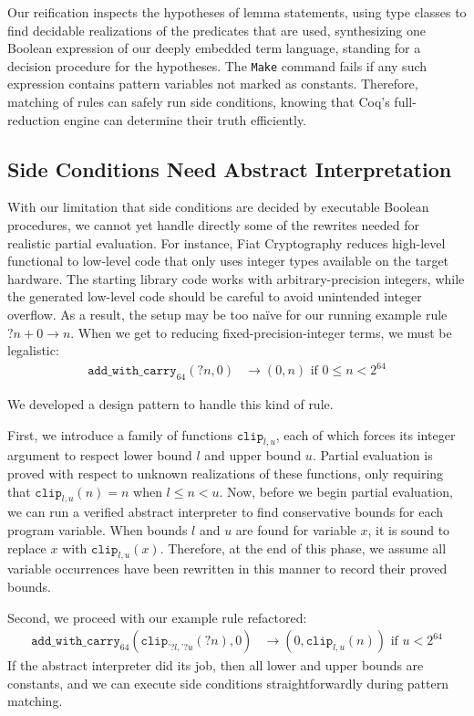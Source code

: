 Our reification inspects the hypotheses of lemma statements, using type classes to find decidable realizations of the predicates that are used, synthesizing one Boolean expression of our deeply embedded term language, standing for a decision procedure for the hypotheses.
The \texttt{Make} command fails if any such expression contains pattern variables not marked as constants.
Therefore, matching of rules can safely run side conditions, knowing that Coq's full-reduction engine can determine their truth efficiently.

\subsection{Side Conditions Need Abstract Interpretation}\label{sec:abs-int}

With our limitation that side conditions are decided by executable Boolean procedures, we cannot yet handle directly some of the rewrites needed for realistic partial evaluation.
For instance, Fiat Cryptography reduces high-level functional to low-level code that only uses integer types available on the target hardware.
The starting library code works with arbitrary-precision integers, while the generated low-level code should be careful to avoid unintended integer overflow.
As a result, the setup may be too naïve for our running example rule ${?n} + 0 \to n$.
When we get to reducing fixed-precision-integer terms, we must be legalistic:
\begin{align*}
  \texttt{add\_with\_carry}_{64}({?n}, 0) & \to (0, n)\text{\ \ if\ \ }0 \le n < 2^{64}
\end{align*}

We developed a design pattern to handle this kind of rule.

First, we introduce a family of functions $\texttt{clip}_{l,u}$, each of which forces its integer argument to respect lower bound $l$ and upper bound $u$.
Partial evaluation is proved with respect to unknown realizations of these functions, only requiring that $\texttt{clip}_{l, u}(n) = n$ when $l \leq n < u$.
Now, before we begin partial evaluation, we can run a verified abstract interpreter to find conservative bounds for each program variable.
When bounds $l$ and $u$ are found for variable $x$, it is sound to replace $x$ with $\texttt{clip}_{l,u}(x)$.
Therefore, at the end of this phase, we assume all variable occurrences have been rewritten in this manner to record their proved bounds.

Second, we proceed with our example rule refactored:
\begin{align*}
  \texttt{add\_with\_carry}_{64}(\texttt{clip}_{\texttt{'}{?l},\texttt{'}{?u}}({?n}), 0) & \to (0, \texttt{clip}_{l,u}(n)) %
  \text{\ \ if\ \ }u < 2^{64}
\end{align*}
If the abstract interpreter did its job, then all lower and upper bounds are constants, and we can execute side conditions straightforwardly during pattern matching.

